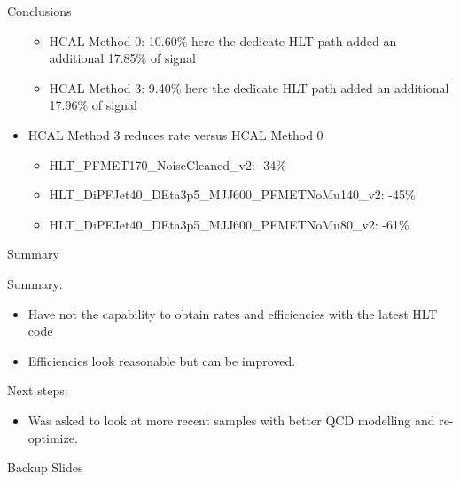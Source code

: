 \documentclass[8pt]{beamer}
\begin{document}
\begin{frame}{Conclusions}
\begin{itemize}
\begin{itemize}
    \item HCAL Method 0: 10.60\% here the dedicate HLT path added an additional 17.85\% of signal
    \item HCAL Method 3: 9.40\% here the dedicate HLT path added an additional 17.96\% of signal
  \end{itemize}
  \item HCAL Method 3 reduces rate versus HCAL Method 0
  \begin{itemize}
    \item HLT\_PFMET170\_NoiseCleaned\_v2: -34\%
    \item HLT\_DiPFJet40\_DEta3p5\_MJJ600\_PFMETNoMu140\_v2: -45\%
    \item HLT\_DiPFJet40\_DEta3p5\_MJJ600\_PFMETNoMu80\_v2: -61\%
  \end{itemize}
\end{itemize}

\end{frame}

\begin{frame}{Summary}
 
\begin{block}{Summary:}
 
\begin{itemize}
  \item Have not the capability to obtain rates and efficiencies with the latest HLT code
  \item Efficiencies look reasonable but can be improved. 
\end{itemize}

\end{block}

\begin{block}{Next steps:}
 
\begin{itemize}
  \item Was asked to look at more recent samples with better QCD modelling and re-optimize. 
\end{itemize}

\end{block}

\end{frame}

\appendix
\begin{frame}
 
\begin{block}

\begin{center}Backup Slides\end{center}

\end{block}

\end{frame}
\end{document}
